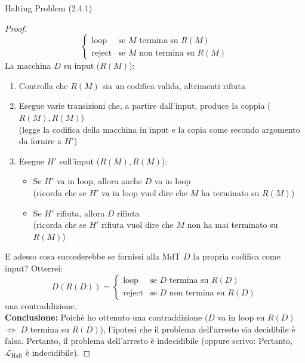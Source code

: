 \documentclass{article}  %
\theoremstyle{definition}
\begin{document}
\begin{theorem}{Halting Problem (2.4.1)}
\begin{proof}
\[			\begin{cases}
				\text{loop}   & \text{se } M \text{ termina su } R(M)      \\
				\text{reject} & \text{se } M \text{  non termina su } R(M)
			\end{cases}
		\]
		La macchina $D$ su input ($R(M)$):
		\begin{enumerate}
			\item Controlla che $R(M)$ sia un codifica valida, altrimenti rifiuta
			\item Esegue varie transizioni che, a partire dall'input, produce la coppia ($R(M),R(M)$) \\
			      (legge la codifica della macchina in input e la copia come secondo argomento da fornire a $H'$)
			\item Esegue $H'$ sull'input ($R(M),R(M)$):
			      \begin{itemize}
				      \item Se $H'$ va in loop, allora anche $D$ va in loop \\
				            (ricorda che se $H'$ va in loop vuol dire che $M$ ha terminato su $R(M)$)
				      \item Se $H'$ rifiuta, allora $D$ rifiuta \\
				            (ricorda che se $H'$ rifiuta vuol dire che $M$ non ha mai terminato su $R(M)$)
			      \end{itemize}
		\end{enumerate}
		E adesso cosa succederebbe se fornissi alla MdT $D$ la propria codifica come input? Otterrei:
		\[
			D(R(D)) =
			\begin{cases}
				\text{loop}   & \text{se } D \text{ termina su } R(D)      \\
				\text{reject} & \text{se } D \text{  non termina su } R(D)
			\end{cases}
		\]
		una contraddizione. \\
		\textbf{Conclusione:} Poichè ho ottenuto una contraddizione ($D$ va in loop su $R(D)$ $\iff$ $D$ termina su $R(D)$), l'ipotesi
		che il problema dell'arresto sia decidibile è falsa. Pertanto, il problema dell'arresto è indecidibile (oppure scrivo:
		Pertanto, $\mathcal{L}_{\text{Halt}}$ è indecidibile).
	\end{proof}
\end{theorem}
\end{document}
